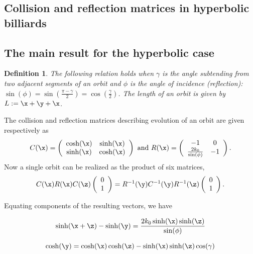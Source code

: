 \documentclass[11pt]{article}
\theoremstyle{plain}
\theoremstyle{definition}
\newtheorem{definition}[theorem]{Definition}
\begin{document}
\subsection{Collision and reflection matrices in hyperbolic billiards}
\subsection{The main result for the hyperbolic case}
\begin{definition}
\textit{The following relation holds when $\gamma$ is the angle subtending from two adjacent segments of an orbit and $\phi$ is the angle of incidence (reflection): $\sin(\phi)=\sin(\frac{\pi-\gamma}{2})=\cos(\frac{\gamma}{2})$.
The length of an orbit is given by $L:=\x+\y+\x$.}
\end{definition}
The collision and reflection matrices describing evolution of an orbit are given respectively as
\begin{equation*}
C(\x)=\left(\begin{array}{cc}
\cosh(\x) & \sinh(\x) \\
\sinh(\x) & \cosh(\x) \end{array}\right)
\mbox{ and }
R(\x)=\left(\begin{array}{cc}
-1 & 0 \\
\frac{2k_0}{\sin(\phi)} & -1 \end{array}\right).
\end{equation*}
Now a single orbit can be realized as the product of six matrices,
\begin{equation*}
C(\x)R(\x)C(\z)\left(\begin{array}{c}
0 \\
1\end{array}\right)=R^{-1}(\y)C^{-1}(\y)R^{-1}(\z)\left(\begin{array}{c}
0 \\
1\end{array}\right).
\end{equation*}

Equating components of the resulting vectors, we have

\begin{equation*}
  \sinh(\x+\z)-\sinh(\y)=\frac{2k_0\sinh(\x)\sinh(\z)}{\sin(\phi)}
\end{equation*}

\begin{equation*}
\cosh(\y)=\cosh(\x)\cosh(\z)-\sinh(\x)\sinh(\z)\cos(\gamma)
\end{equation*}
\end{document}
